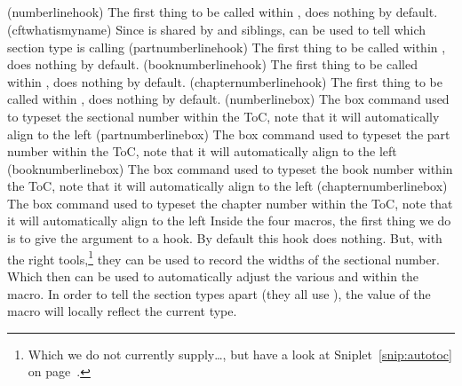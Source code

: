 \begin{syntax}
  \cmd{\numberlinehook}\\
  \cmd{\cftwhatismyname}\\
  \cmd{\booknumberlinehook}\\
  \cmd{\partnumberlinehook}\\
  \cmd{\chapternumberlinehook}\\
  \cmd{\numberlinebox}\\
  \cmd{\booknumberlinebox}\\
  \cmd{\partnumberlinebox}\\
  \cmd{\chapternumberlinebox}\\
\end{syntax}
\glossary(numberlinehook)
 {}
 {The first thing to be called within , does nothing by
 default.}
\glossary(cftwhatismyname)
 {}
 {Since  is shared by  and siblings, 
    can be used to tell which section type is
   calling }
\glossary(partnumberlinehook)
 {}
 {The first thing to be called within , does nothing by
 default.}
\glossary(booknumberlinehook)
 {}
 {The first thing to be called within , does nothing by
 default.}
\glossary(chapternumberlinehook)
 {}
 {The first thing to be called within , does nothing by
 default.}
\glossary(numberlinebox)
 {}
 {The box command used to typeset the sectional number within the ToC,
   note that it will automatically align to the left}
\glossary(partnumberlinebox)
 {}
 {The box command used to typeset the part number within the ToC, 
   note that it will automatically align to the left}
\glossary(booknumberlinebox)
 {}
 {The box command used to typeset the book number within the ToC, 
   note that it will automatically align to the left}
\glossary(chapternumberlinebox)
 {}
 {The box command used to typeset the chapter number within the ToC, 
   note that it will automatically align to the left}
Inside the four  macros, the first thing we do is to
give the  argument to a hook. By default this hook
does nothing. But, with the right
tools,\footnote{Which we do not currently supply\dots, but have a look
at Sniplet~\ref{snip:autotoc} on page~\pageref{snip:autotoc}.}
they can be used to record the widths of the sectional number. Which then
can be used to automatically adjust the various  and
 within the  macro. In order to 
tell the section types apart (they all use \cmd{\numberline}), the
value of the \cmd{\cftwhatismyname} macro will locally reflect the
current type. 


